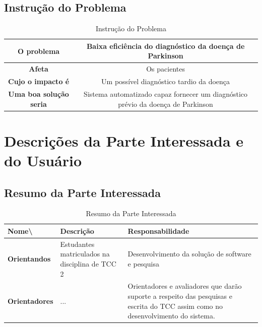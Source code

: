 \begin{anexosenv}
	\subsection{Instrução do Problema}

	\begin{table}[]
		\centering
		\caption{Instrução do Problema}
		\begin{tabular}{|c|c|}
			\hline
			\textbf{O problema}            & Baixa eficiência do diagnóstico da doença de Parkinson                           \\ \hline
			\textbf{Afeta}                 & Os pacientes                                                                     \\ \hline
			\textbf{Cujo o impacto é}      & Um possível diagnóstico tardio da doença                                         \\ \hline
			\textbf{Uma boa solução seria} & Sistema automatizado capaz fornecer um diagnóstico prévio da doença de Parkinson \\ \hline
		\end{tabular}
		\label{table:Instrução do Problema}
	\end{table}

	\section{Descrições da Parte Interessada e do Usuário}

	\subsection{Resumo da Parte Interessada}

	\begin{table}[]
		\centering
		\caption{Resumo da Parte Interessada}
		\begin{tabular}{@{}|l|l|l|@{}}
			\toprule
			\textbf{Nome\textbackslash{}} & \textbf{Descrição}                             & \textbf{Responsabilidade}                                                                                                        \\ \midrule
			\textbf{Orientandos}          & Estudantes matriculados na disciplina de TCC 2 & Desenvolvimento da solução de software e pesquisa                                                                                \\ \midrule
			\textbf{Orientadores}         & ...                                            & Orientadores e avaliadores que darão suporte a respeito das pesquisas e escrita do TCC assim como no desenvolvimento do sistema. \\ \bottomrule
		\end{tabular}
		\label{table:Resumo da Parte Interessada}
	\end{table}


\end{anexosenv}
